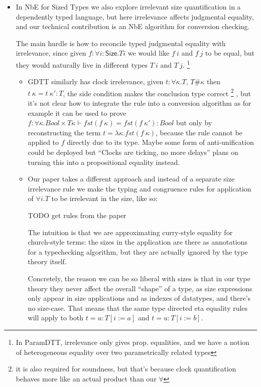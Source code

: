 \documentclass{book}
\begin{document}
\begin{itemize}
    \item In NbE for Sized Types we also explore irrelevant size
    quantification in a dependently typed language, but here
    irrelevance affects judgmental equality, and our technical
    contribution is an NbE algorithm for conversion checking.
    
    The main hurdle is how to reconcile typed judgmental equality with
    irrelevance, since given $f : \forall i : \mathsf{Size}. T i$ we would like
    $f~i$ and $f~j$ to be equal, but they would naturally live in
    different types $T~i$ and $T~j$.
    \footnote{In ParamDTT, irrelevance only gives prop. equalities,
      and we have a notion of heterogeneous equality over two
      parametrically related types}
    \begin{itemize}
    \item GDTT similarly has clock irrelevance, given $t : \forall
    \kappa. T$, $T \# \kappa$ then $t~\kappa = t~\kappa' : T$, the
    side condition makes the conclusion type correct
    \footnote{it is also required for soundness, but that's because
      clock quantification behaves more like an actual product than
      our $\forall$}
    , but it's not clear how to integrate the rule into a conversion
    algorithm as for example it can be used to prove
    $f : \forall \kappa. Bool \times T \kappa \vdash fst (f~\kappa) = fst (f~\kappa') : Bool$
    but only by reconstructing the term $t = \lambda \kappa. fst
    (f~\kappa)$, because the rule cannot be applied to $f$ directly
    due to its type.
    Maybe some form of anti-unification could be deployed but ``Clocks
    are ticking, no more delays'' plans on turning this into a
    propositional equality instead.
    
    \item Our paper takes a different approach and instead of a separate
    size irrelevance rule we make the typing and congruence rules for
    application of $\forall i. T$ to be irrelevant in the size, like so:

      TODO get rules from the paper

   The intuition is that we are approximating curry-style equality for
   church-style terms: the sizes in the application are there as
   annotations for a typechecking algorithm, but they are actually
   ignored by the type theory itself.

   Concretely, the reason we can be so liberal with sizes is that
   in our type theory they never affect the overall ``shape'' of a
   type, as size expressions only appear in size applications and as
   indexes of datatypes, and there's no size-case. That means that the
   same type directed eta equality rules will apply to both $t = u :
   T[i:=a]$ and $t = u : T[i:=b]$.


\end{itemize}
\end{itemize}
\end{document}
